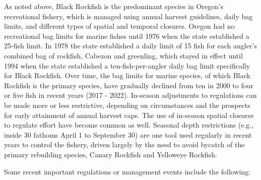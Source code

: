 \documentclass[11pt,
  letterpaper,
]{article}
\begin{document}
As noted above, Black Rockfish is the predominant species in Oregon's recreational fishery, which is managed using annual harvest guidelines, daily bag limits, and different types of spatial and temporal closures. Oregon had no recreational bag limits for marine fishes until 1976 when the state established a 25-fish limit. In 1978 the state established a daily limit of 15 fish for each angler's combined bag of rockfish, Cabezon and greenling, which stayed in effect until 1994 when the state established a ten-fish-per-angler daily bag limit specifically for Black Rockfish. Over time, the bag limits for marine species, of which Black Rockfish is the primary species, have gradually declined from ten in 2000 to four or five fish in recent years (2017 - 2022). In-season adjustments to regulations can be made more or less restrictive, depending on circumstances and the prospects for early attainment of annual harvest caps. The use of in-season spatial closures to regulate effort have become common as well. Seasonal depth restrictions (e.g., inside 30 fathoms April 1 to September 30) are one tool used regularly in recent years to control the fishery, driven largely by the need to avoid bycatch of the primary rebuilding species, Canary Rockfish and Yelloweye Rockfish.

Some recent important regulations or management events include the following:
\end{document}
